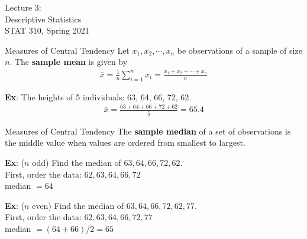 \documentclass{beamer}
\begin{document}
\begin{frame}
\large
Lecture 3:\\
Descriptive Statistics\\
STAT 310, Spring 2021
\normalsize
\end{frame}

\begin{frame}{Measures of Central Tendency}
Let $x_1, x_2, \cdots, x_n$ be observations of a sample of size $n$.  The \textbf{sample mean} is given by 
\begin{align*}
\bar{x} = \frac{1}{n}\sum_{i=1}^n x_i = \frac{x_1 + x_2 + \cdots + x_n}{n}
\end{align*}

\vspace{15pt}
\textbf{Ex}: The heights of 5 individuals: 63, 64, 66, 72, 62. 
\begin{align*}
\bar{x} = \frac{63 + 64 + 66 + 72 + 62}{5} = 65.4
\end{align*}
\end{frame}

\begin{frame}{Measures of Central Tendency}
\vspace{-1cm}
The \textbf{sample median} of a set of observations is the middle value when values are ordered from smallest to largest.\\
\vspace{20pt}

\textbf{Ex}: ($n$ odd) Find the median of $63, 64, 66, 72, 62$.\\
\medskip
{\color{blue}
First, order the data: $62, 63, 64, 66, 72$\\
median $= 64$\\
}
\vspace{10pt}

\textbf{Ex}: ($n$ even) Find the median of $63, 64, 66, 72, 62, 77$.\\
\medskip
{\color{blue}
First, order the data: $62, 63, 64, 66, 72, 77$\\
median $= (64+66)/2 = 65$\\
}
\end{frame}
\end{document}
